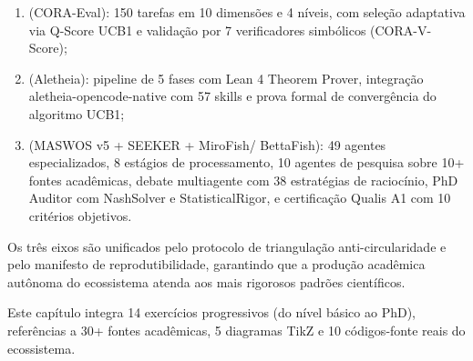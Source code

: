 \begin{enumerate}
\item {} (CORA-Eval): 150 tarefas em 10
dimensões e 4 níveis, com seleção adaptativa via Q-Score UCB1 e
validação por 7 verificadores simbólicos (CORA-V-Score);
\item {} (Aletheia): pipeline de 5 fases
com Lean 4 Theorem Prover, integração aletheia-opencode-native com
57 skills e prova formal de convergência do algoritmo UCB1;
\item {} (MASWOS v5 + SEEKER + MiroFish/
BettaFish): 49 agentes especializados, 8 estágios de processamento,
10 agentes de pesquisa sobre 10+ fontes acadêmicas, debate
multiagente com 38 estratégias de raciocínio, PhD Auditor com
NashSolver e StatisticalRigor, e certificação Qualis A1 com 10
critérios objetivos.
\end{enumerate}

Os três eixos são unificados pelo protocolo de triangulação
anti-circularidade e pelo manifesto de reprodutibilidade,
garantindo que a produção acadêmica autônoma do ecossistema atenda
aos mais rigorosos padrões científicos.

Este capítulo integra 14 exercícios progressivos (do nível básico ao
PhD), referências a 30+ fontes acadêmicas, 5 diagramas TikZ e 10
códigos-fonte reais do ecossistema.
